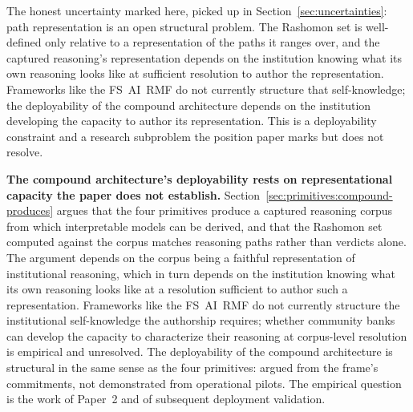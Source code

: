 The honest uncertainty marked here, picked up in Section~\ref{sec:uncertainties}: path representation is an open structural problem. The Rashomon set is well-defined only relative to a representation of the paths it ranges over, and the captured reasoning's representation depends on the institution knowing what its own reasoning looks like at sufficient resolution to author the representation. Frameworks like the FS~AI~RMF do not currently structure that self-knowledge; the deployability of the compound architecture depends on the institution developing the capacity to author its representation. This is a deployability constraint and a research subproblem the position paper marks but does not resolve.


\textbf{The compound architecture's deployability rests on representational capacity the paper does not establish.} Section~\ref{sec:primitives:compound-produces} argues that the four primitives produce a captured reasoning corpus from which interpretable models can be derived, and that the Rashomon set computed against the corpus matches reasoning paths rather than verdicts alone. The argument depends on the corpus being a faithful representation of institutional reasoning, which in turn depends on the institution knowing what its own reasoning looks like at a resolution sufficient to author such a representation. Frameworks like the FS~AI~RMF do not currently structure the institutional self-knowledge the authorship requires; whether community banks can develop the capacity to characterize their reasoning at corpus-level resolution is empirical and unresolved. The deployability of the compound architecture is structural in the same sense as the four primitives: argued from the frame's commitments, not demonstrated from operational pilots. The empirical question is the work of Paper~2 and of subsequent deployment validation.

